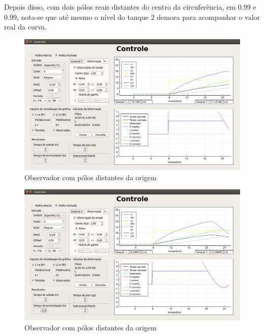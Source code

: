 \documentclass[a4paper,12pt]{article}
\begin{document}
\newpage
\hspace{4ex}Depois disso, com dois pólos reais distantes do centro da circuferência, em 0.99 e 0.99, nota-se que até mesmo o nível do tanque 2 demora para acompanhar o valor real da curva.
\begin{figure}[!h]
\centering
\includegraphics[width=13cm]{FotosObservador/PolosMuitoLentos1}
\caption{Observador com pólos distantes da origem}
\label{img5}
\end{figure}
\begin{figure}[!h]
\centering
\includegraphics[width=13cm]{FotosObservador/PolosMuitoLentos2}
\caption{Observador com pólos distantes da origem}
\label{img6}
\end{figure}
\end{document}
